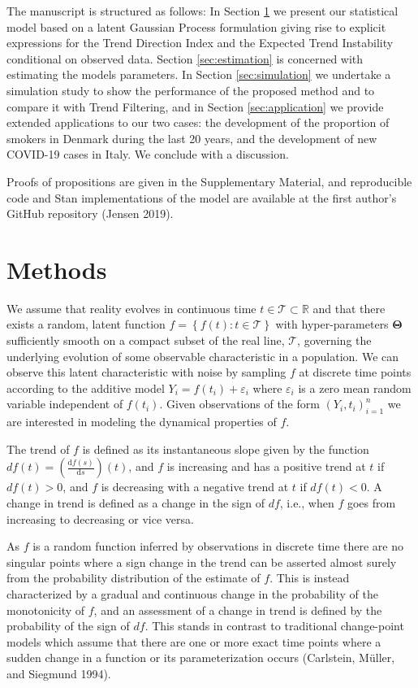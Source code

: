 \documentclass[
  11pt,
]{article}
\theoremstyle{nonumberplain}
\begin{document}
The manuscript is structured as follows: In Section \ref{sec:method} we
present our statistical model based on a latent Gaussian Process
formulation giving rise to explicit expressions for the Trend Direction
Index and the Expected Trend Instability conditional on observed data.
Section \ref{sec:estimation} is concerned with estimating the models
parameters. In Section \ref{sec:simulation} we undertake a simulation
study to show the performance of the proposed method and to compare it
with Trend Filtering, and in Section \ref{sec:application} we provide
extended applications to our two cases: the development of the
proportion of smokers in Denmark during the last 20 years, and the
development of new COVID-19 cases in Italy. We conclude with a
discussion.

Proofs of propositions are given in the Supplementary Material, and
reproducible code and Stan implementations of the model are available at
the first author's GitHub repository (Jensen 2019).

\hypertarget{sec:method}{%
\section{Methods}\label{sec:method}}

We assume that reality evolves in continuous time
\(t \in \mathcal{T} \subset \mathbb{R}\) and that there exists a random,
latent function \(f = \left\{f(t) : t \in \mathcal{T}\right\}\) with
hyper-parameters \(\bm{\Theta}\) sufficiently smooth on a compact subset
of the real line, \(\mathcal{T}\), governing the underlying evolution of
some observable characteristic in a population. We can observe this
latent characteristic with noise by sampling \(f\) at discrete time
points according to the additive model \(Y_i = f(t_i) + \varepsilon_i\)
where \(\varepsilon_i\) is a zero mean random variable independent of
\(f(t_i)\). Given observations of the form \((Y_i, t_i)_{i=1}^n\) we are
interested in modeling the dynamical properties of \(f\).

The trend of \(f\) is defined as its instantaneous slope given by the
function \(df(t) = \left(\frac{\mathrm{d}f(s)}{\mathrm{d}s}\right)(t)\),
and \(f\) is increasing and has a positive trend at \(t\) if
\(df(t) > 0\), and \(f\) is decreasing with a negative trend at \(t\) if
\(df(t) < 0\). A change in trend is defined as a change in the sign of
\(df\), i.e., when \(f\) goes from increasing to decreasing or vice
versa.

As \(f\) is a random function inferred by observations in discrete time
there are no singular points where a sign change in the trend can be
asserted almost surely from the probability distribution of the estimate
of \(f\). This is instead characterized by a gradual and continuous
change in the probability of the monotonicity of \(f\), and an
assessment of a change in trend is defined by the probability of the
sign of \(df\). This stands in contrast to traditional change-point
models which assume that there are one or more exact time points where a
sudden change in a function or its parameterization occurs (Carlstein,
Müller, and Siegmund 1994).
\end{document}
